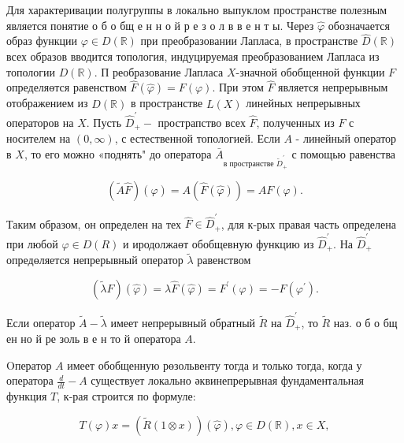 \documentclass[10pt]{article}
\begin{document}
Для характеривации полугруппы в локально выпуклом пространстве полезным является понятие о б о бщ е н н о й р е з о л в в е н т ы. Через $\hat{\varphi}$ обозначается образ функции $\varphi \in D(\mathbb{R})$ при преобразовании Лапласа, в пространстве $\hat{D}(\mathbb{R})$ всех образов вводится топология, индуцируемая преобразованием Лапласа из топологии $D(\mathbb{R})$. П реобразование Лапласа $X$-значной обобщенной функции $F$ определяөтся равенством $\hat{F}(\widehat{\varphi})=F(\varphi)$. При этом $\hat{F}$ является непрерывным отображением из $\hat{D}(\mathbb{R})$ в пространстве $L(X)$ линейных непрерывных операторов на $X$. Пусть $\hat{D}_{+}^{\prime}-$ прострапство всех $\hat{F}$, полученных из $F$ с носителем на $(0, \infty)$, с естественной топологией. Если $A$ - линейный оператор в $X$, то его можно «поднять" до оператора $\bar{A}_{\text {в пространстве } \tilde{D}_{+}^{\prime}}$ с помощью равенства



\[

(\tilde{A} \hat{F})(\hat{\varphi})=A(\hat{F}(\hat{\varphi}))=A F(\varphi) .

\]



Таким образом, он определен на тех $\hat{F} \in \hat{D}_{+}^{\prime}$, для к-рых правая часть определена при любой $\varphi \in D(R)$ и иродолжаөт обобщевную функцию из $\widehat{D}_{+}^{\prime}$. На $\widehat{D}_{+}^{\prime}$ опредөляется непрерывный оператор $\tilde{\lambda}$ равенством



\[

(\tilde{\lambda} \hat{F})(\hat{\varphi})=\lambda \hat{F}(\hat{\varphi})=F^{\prime}(\varphi)=-F\left(\varphi^{\prime}\right) .

\]



Если оператор $\tilde{A}-\tilde{\lambda}$ имеет непрерывный обратный $\tilde{R}$ на $\widehat{D}_{+}^{\prime}$, то $\widetilde{R}$ наз. о б о бщ ен но й ре золь в е н то й оператора $A$.



Oператор $A$ имеет обобщенную рөзольвенту тогда и только тогда, когда у оператора $\frac{d}{d t}-A$ существует локально әквинепрерывная фундаментальная функция $T$, к-рая строится по формуле:



\[

T(\varphi) x=(\tilde{R}(1 \otimes x))(\hat{\varphi}), \varphi \in D(\mathbb{R}), x \in X,

\]
\end{document}
